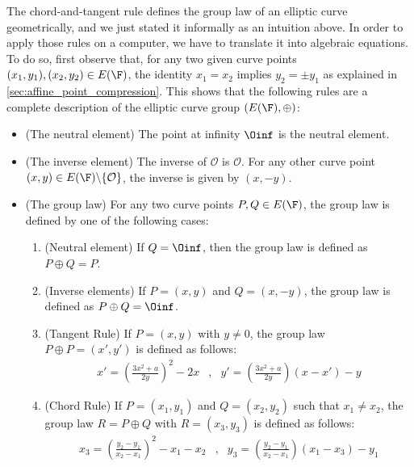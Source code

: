 The chord-and-tangent rule defines the group law of an elliptic curve geometrically, and we just stated it informally as an intuition above. In order to apply those rules on a computer, we have to translate it into algebraic equations. To do so, first observe that, for any two given curve points $(x_1,y_1), (x_2,y_2)\in E(\F)$, the identity $x_1=x_2$ implies $y_2=\pm y_1$ as explained in \secname{} \ref{sec:affine_point_compression}. This shows that the following rules are a complete description of the elliptic curve group $(E(\F),\oplus)$:

\begin{definition}\label{def:chord-tangent-algebra}
\begin{itemize}
\item (The neutral element) The point at infinity $\Oinf$ is the neutral element.
\item (The inverse element) The inverse of $\mathcal{O}$ is $\mathcal{O}$. For any other curve point $(x,y) \in E(\F)\backslash \{\mathcal{O}\}$, the inverse is given by $(x,-y)$.
\item (The group law) For any two curve points $P, Q \in E(\F)$, the group law is defined by one of the following cases:
\begin{enumerate}
\item (Neutral element) If $Q=\Oinf$, then the group law is defined as $P\oplus Q=P$.
\item (Inverse elements)  If $P=(x,y)$ and $Q=(x,-y)$, the group law is defined as $P\oplus Q=\Oinf$.
\item (Tangent Rule) If $P=(x,y)$ with $y\neq 0$, the group law $P\oplus P=(x',y')$ is defined as follows:
$$
\begin{array}{llr}
x' = \left(\frac{3x^2+a}{2y}\right)^2 -2x &,&
y' = \left(\frac{3x^2+a}{2y}\right)\left(x-x'\right) - y
\end{array} 
$$
\item (Chord Rule) If $P=(x_1,y_1)$ and $Q=(x_2,y_2)$ such that $x_1 \neq x_2$, the group law $R=P\oplus Q$ with $R=(x_3,y_3)$ is defined as follows:
$$
\begin{array}{llr}
x_3 = \left(\frac{y_2-y_1}{x_2-x_1}\right)^2 -x_1-x_2 &, &
y_3 = \left(\frac{y_2-y_1}{x_2-x_1} \right)\left(x_1-x_3\right) - y_1
\end{array} 
$$
\end{enumerate}
\end{itemize}
\end{definition}
